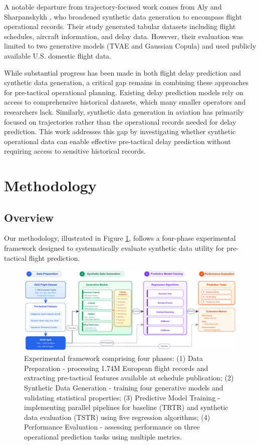 \documentclass[conference]{IEEEtran}
\begin{document}
A notable departure from trajectory-focused work comes from Aly and Sharpanskykh \cite{aly2025synthetic}, who broadened synthetic data generation to encompass flight operational records. Their study generated tabular datasets including flight schedules, aircraft information, and delay data. However, their evaluation was limited to two generative models (TVAE and Gaussian Copula) and used publicly available U.S. domestic flight data.


While substantial progress has been made in both flight delay prediction and synthetic data generation, a critical gap remains in combining these approaches for pre-tactical operational planning. Existing delay prediction models rely on access to comprehensive historical datasets, which many smaller operators and researchers lack. Similarly, synthetic data generation in aviation has primarily focused on trajectories rather than the operational records needed for delay prediction. This work addresses this gap by investigating whether synthetic operational data can enable effective pre-tactical delay prediction without requiring access to sensitive historical records.



\section{Methodology}

\subsection{Overview} 
Our methodology, illustrated in Figure \ref{fig:framework}, follows a four-phase experimental framework designed to systematically evaluate synthetic data utility for pre-tactical flight prediction. 


\begin{figure}[t]
    \centering
    \includegraphics[width=\textwidth]{diagrams/overall_framework.pdf}
    \caption{Experimental framework comprising four phases: (1) Data Preparation - processing 1.74M European flight records and extracting pre-tactical features available at schedule publication; (2) Synthetic Data Generation - training four generative models and validating statistical properties; (3) Predictive Model Training - implementing parallel pipelines for baseline (TRTR) and synthetic data evaluation (TSTR) using five regression algorithms; (4) Performance Evaluation - assessing performance on three operational prediction tasks using multiple metrics.}
    \label{fig:framework}
\end{figure}
\end{document}
